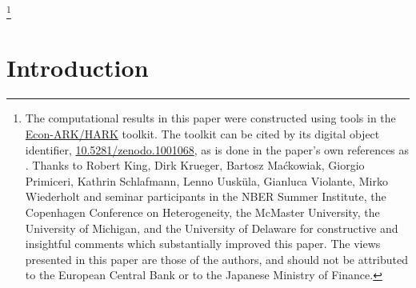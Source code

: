 \begin{adjustwidth}{-1em}{-1em}
\begin{authorsinfo}
\end{authorsinfo}
\thanks{The computational results in this paper were constructed using tools in the \href{http://github.com/Econ-ARK/HARK}{Econ-ARK/HARK} toolkit.  The toolkit can be cited by its digital object identifier, \href{https://doi.org/10.5281/zenodo.1001068}{10.5281/zenodo.1001068}, as is done in the paper's own references as \cite{matthew_n_white_2017_1001068}.  Thanks to Robert King, Dirk Krueger, Bartosz Ma\'ckowiak, Giorgio Primiceri, Kathrin Schlafmann, Lenno Uusk\"ula, Gianluca Violante, Mirko Wiederholt and seminar participants in the NBER Summer Institute, the Copenhagen Conference on Heterogeneity, the McMaster University, the University of Michigan, and the University of Delaware for constructive and insightful comments which substantially improved this paper. The views presented in this paper are those of the authors, and should not be attributed to the European Central Bank or to the Japanese Ministry of Finance.}

\titlepagefinish
\setcounter{page}{1}
\end{adjustwidth}
\pagebreak

\hypertarget{Introduction}{}
\section{Introduction}\label{sec:introduction}


